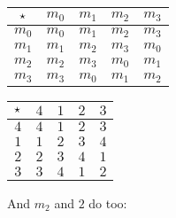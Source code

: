 \documentclass[../../../main.tex]{subfiles}
\begin{document}
\begin{center}
  \begin{tabular}{| c || c | c | c | c |}
    \hline
    $\opSymbol/$ & $m_{0}$ & \cellcolor{grey3} $m_{1}$ & $m_{2}$ & $m_{3}$ \\ \hline \hline
    $m_{0}$      & $m_{0}$ & \cellcolor{grey3} $m_{1}$ & $m_{2}$ & $m_{3}$ \\ \hline
    \cellcolor{grey3} $m_{1}$      & \cellcolor{grey3} $m_{1}$ & $m_{2}$ & $m_{3}$ & $m_{0}$ \\ \hline
    $m_{2}$      & $m_{2}$ & $m_{3}$ & $m_{0}$ & \cellcolor{grey3} $m_{1}$ \\ \hline
    $m_{3}$      & $m_{3}$ & $m_{0}$ & \cellcolor{grey3} $m_{1}$ & $m_{2}$ \\ \hline
  \end{tabular}
  \hskip 2cm
  \begin{tabular}{| c || c | c | c | c |}
    \hline
    $\opSymbol/$ & $4$ & \cellcolor{grey3} $1$ & $2$ & $3$ \\ \hline \hline
    $4$          & $4$ & \cellcolor{grey3} $1$ & $2$ & $3$ \\ \hline
    \cellcolor{grey3} $1$          & \cellcolor{grey3} $1$ & $2$ & $3$ & $4$ \\ \hline
    $2$          & $2$ & $3$ & $4$ & \cellcolor{grey3} $1$ \\ \hline
    $3$          & $3$ & $4$ & \cellcolor{grey3} $1$ & $2$ \\ \hline
  \end{tabular}
\end{center}

And $m_{2}$ and $2$ do too:
\end{document}
